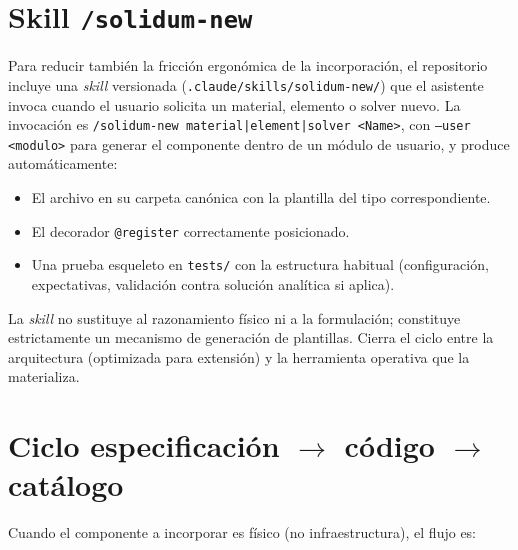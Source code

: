 \documentclass[11pt,oneside]{report}
\begin{document}
\section{Skill \texttt{/solidum-new}}

Para reducir también la fricción ergonómica de la incorporación, el repositorio incluye una \textit{skill} versionada (\texttt{.\allowbreak{}claude/\allowbreak{}skills/\allowbreak{}solidum-new/\allowbreak{}}) que el asistente invoca cuando el usuario solicita un material, elemento o solver nuevo. La invocación es \texttt{/\allowbreak{}solidum-new material|element|solver \textless{}Name\textgreater{}}, con \texttt{--user \textless{}modulo\textgreater{}} para generar el componente dentro de un módulo de usuario, y produce automáticamente:

\begin{itemize}
  \item El archivo en su carpeta canónica con la plantilla del tipo correspondiente.
  \item El decorador \texttt{@register} correctamente posicionado.
  \item Una prueba esqueleto en \texttt{tests/} con la estructura habitual (configuración, expectativas, validación contra solución analítica si aplica).
\end{itemize}

La \textit{skill} no sustituye al razonamiento físico ni a la formulación; constituye estrictamente un mecanismo de generación de plantillas. Cierra el ciclo entre la arquitectura (optimizada para extensión) y la herramienta operativa que la materializa.

\section{Ciclo especificación \ensuremath{\to} código \ensuremath{\to} catálogo}

Cuando el componente a incorporar es físico (no infraestructura), el flujo es:
\end{document}
